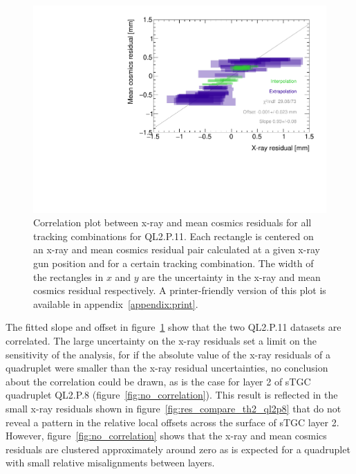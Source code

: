\begin{figure}
    \centering
    \includegraphics[width = \textwidth]{figures/figure_QL2P11_3100V_2021-08-05_QL2P11_local_cosmic_and_xray_data_correlation_plot.pdf}
    \caption{Correlation plot between x-ray and mean cosmics residuals for all tracking combinations for QL2.P.11. Each rectangle is centered on an x-ray and mean cosmics residual pair calculated at a given x-ray gun position and for a certain tracking combination. The width of the rectangles in $x$ and $y$ are the uncertainty in the x-ray and mean cosmics residual respectively. A printer-friendly version of this plot is available in appendix~\ref{appendix:print}.}
    \label{fig:correlation}
\end{figure}

The fitted slope and offset in figure~\ref{fig:correlation} show that the two QL2.P.11 datasets are correlated. The large uncertainty on the x-ray residuals set a limit on the sensitivity of the analysis, for if the absolute value of the x-ray residuals of a quadruplet were smaller than the x-ray residual uncertainties, no conclusion about the correlation could be drawn, as is the case for layer 2 of sTGC quadruplet QL2.P.8 (figure~\ref{fig:no_correlation}). This result is reflected in the small x-ray residuals shown in figure~\ref{fig:res_compare_th2_ql2p8} that do not reveal a pattern in the relative local offsets across the surface of sTGC layer 2. However, figure~\ref{fig:no_correlation} shows that the x-ray and mean cosmics residuals are clustered approximately around zero as is expected for a quadruplet with small relative misalignments between layers.

